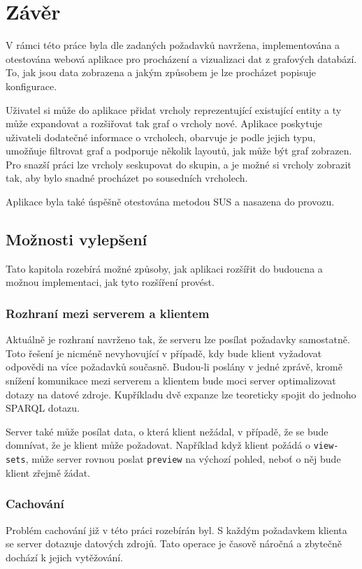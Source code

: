 \chapter*{Závěr}
V rámci této práce byla dle zadaných požadavků navržena, implementována a otestována webová aplikace pro procházení a vizualizaci dat z grafových databází. To, jak jsou data zobrazena a jakým způsobem je lze procházet popisuje konfigurace.

Uživatel si může do aplikace přidat vrcholy reprezentující existující entity a ty může expandovat a rozšiřovat tak graf o vrcholy nové. Aplikace poskytuje uživateli dodatečné informace o vrcholech, obarvuje je podle jejich typu, umožňuje filtrovat graf a podporuje několik layoutů, jak může být graf zobrazen. Pro snazší práci lze vrcholy seskupovat do skupin, a je možné si vrcholy zobrazit tak, aby bylo snadné procházet po sousedních vrcholech.

Aplikace byla také úspěšně otestována metodou SUS a nasazena do provozu.

\section{Možnosti vylepšení}
Tato kapitola rozebírá možné způsoby, jak aplikaci rozšířit do budoucna a možnou implementaci, jak tyto rozšíření provést.

\subsection*{Rozhraní mezi serverem a klientem}
Aktuálně je rozhraní navrženo tak, že serveru lze posílat požadavky samostatně. Toto řešení je nicméně nevyhovující v případě, kdy bude klient vyžadovat odpovědi na více požadavků současně. Budou-li poslány v jedné zprávě, kromě snížení komunikace mezi serverem a klientem bude moci server optimalizovat dotazy na datové zdroje. Kupříkladu dvě expanze lze teoreticky spojit do jednoho SPARQL dotazu.

Server také může posílat data, o která klient nežádal, v případě, že se bude domnívat, že je klient může požadovat. Například když klient požádá o \texttt{view-sets}, může server rovnou poslat \texttt{preview} na výchozí pohled, neboť o něj bude klient zřejmě žádat.

\subsection*{Cachování}
Problém cachování již v této práci rozebírán byl. S každým požadavkem klienta se server dotazuje datových zdrojů. Tato operace je časově náročná a zbytečně dochází k jejich vytěžování.

